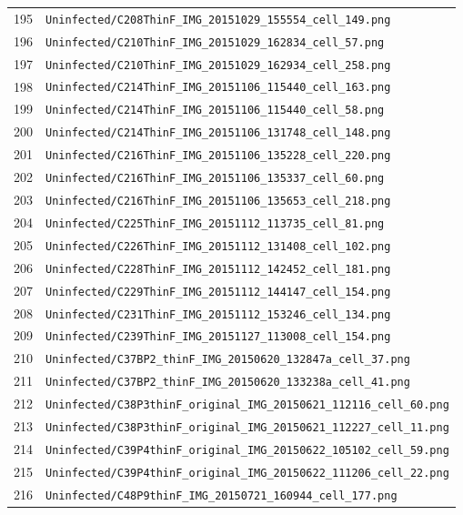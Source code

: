 \begin{longtable}{r p{12cm}}
195 & \texttt{Uninfected/C208ThinF\_IMG\_20151029\_155554\_cell\_149.png} \\
196 & \texttt{Uninfected/C210ThinF\_IMG\_20151029\_162834\_cell\_57.png} \\
197 & \texttt{Uninfected/C210ThinF\_IMG\_20151029\_162934\_cell\_258.png} \\
198 & \texttt{Uninfected/C214ThinF\_IMG\_20151106\_115440\_cell\_163.png} \\
199 & \texttt{Uninfected/C214ThinF\_IMG\_20151106\_115440\_cell\_58.png} \\
200 & \texttt{Uninfected/C214ThinF\_IMG\_20151106\_131748\_cell\_148.png} \\
201 & \texttt{Uninfected/C216ThinF\_IMG\_20151106\_135228\_cell\_220.png} \\
202 & \texttt{Uninfected/C216ThinF\_IMG\_20151106\_135337\_cell\_60.png} \\
203 & \texttt{Uninfected/C216ThinF\_IMG\_20151106\_135653\_cell\_218.png} \\
204 & \texttt{Uninfected/C225ThinF\_IMG\_20151112\_113735\_cell\_81.png} \\
205 & \texttt{Uninfected/C226ThinF\_IMG\_20151112\_131408\_cell\_102.png} \\
206 & \texttt{Uninfected/C228ThinF\_IMG\_20151112\_142452\_cell\_181.png} \\
207 & \texttt{Uninfected/C229ThinF\_IMG\_20151112\_144147\_cell\_154.png} \\
208 & \texttt{Uninfected/C231ThinF\_IMG\_20151112\_153246\_cell\_134.png} \\
209 & \texttt{Uninfected/C239ThinF\_IMG\_20151127\_113008\_cell\_154.png} \\
210 & \texttt{Uninfected/C37BP2\_thinF\_IMG\_20150620\_132847a\_cell\_37.png} \\
211 & \texttt{Uninfected/C37BP2\_thinF\_IMG\_20150620\_133238a\_cell\_41.png} \\
212 & \texttt{Uninfected/C38P3thinF\_original\_IMG\_20150621\_112116\_cell\_60.png} \\
213 & \texttt{Uninfected/C38P3thinF\_original\_IMG\_20150621\_112227\_cell\_11.png} \\
214 & \texttt{Uninfected/C39P4thinF\_original\_IMG\_20150622\_105102\_cell\_59.png} \\
215 & \texttt{Uninfected/C39P4thinF\_original\_IMG\_20150622\_111206\_cell\_22.png} \\
216 & \texttt{Uninfected/C48P9thinF\_IMG\_20150721\_160944\_cell\_177.png} \\

\end{longtable}
